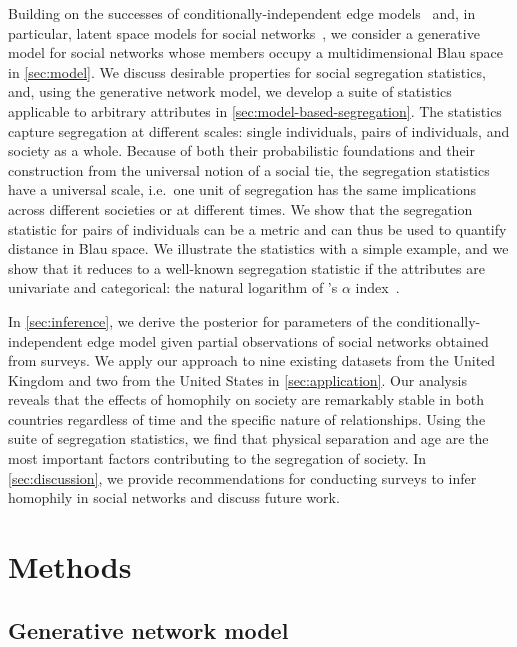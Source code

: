 \documentclass{scrartcl}
\begin{document}
Building on the successes of conditionally-independent edge models~\cite{Snijders2011} and, in particular, latent space models for social networks~\cite{Hoff2002,Hoff2008}, we consider a generative model for social networks whose members occupy a multidimensional Blau space in \cref{sec:model}. We discuss desirable properties for social segregation statistics, and, using the generative network model, we develop a suite of statistics applicable to arbitrary attributes in \cref{sec:model-based-segregation}. The statistics capture segregation at different scales: single individuals, pairs of individuals, and society as a whole. Because of both their probabilistic foundations and their construction from the universal notion of a social tie, the segregation statistics have a universal scale, i.e.\ one unit of segregation has the same implications across different societies or at different times. We show that the segregation statistic for pairs of individuals can be a metric and can thus be used to quantify distance in Blau space. We illustrate the statistics with a simple example, and we show that it reduces to a well-known segregation statistic if the attributes are univariate and categorical: the natural logarithm of \citeauthor{Moody2001}'s $\alpha$ index~\cite{Moody2001}.

In \cref{sec:inference}, we derive the posterior for parameters of the conditionally-independent edge model given partial observations of social networks obtained from surveys. We apply our approach to nine existing datasets from the United Kingdom and two from the United States in \cref{sec:application}. Our analysis reveals that the effects of homophily on society are remarkably stable in both countries regardless of time and the specific nature of relationships. Using the suite of segregation statistics, we find that physical separation and age are the most important factors contributing to the segregation of society. In \cref{sec:discussion}, we provide recommendations for conducting surveys to infer homophily in social networks and discuss future work.

\section{Methods}

\subsection{Generative network model\label{sec:model}}
\end{document}

